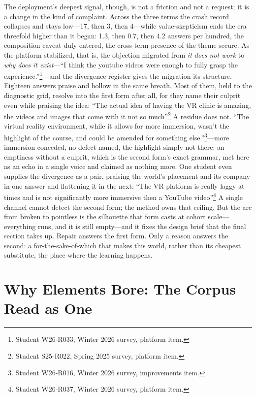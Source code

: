 \documentclass{article}
\begin{document}
The deployment's deepest signal, though, is not a friction and not a request; it is a change in the kind of complaint. Across the three terms the crash record collapses and stays low---17, then 3, then 4---while value-skepticism ends the era threefold higher than it began: 1.3, then 0.7, then 4.2 answers per hundred, the composition caveat duly entered, the cross-term presence of the theme secure. As the platform stabilized, that is, the objection migrated from \textit{it does not work} to \textit{why does it exist}---``I think the youtube videos were enough to fully grasp the experience.''\footnote{Student W26-R033, Winter 2026 survey, platform item.}---and the divergence register gives the migration its structure. Eighteen answers praise and hollow in the same breath. Most of them, held to the diagnostic grid, resolve into the first form after all, for they name their culprit even while praising the idea: ``The actual idea of having the VR clinic is amazing, the videos and images that come with it not so much''\footnote{Student S25-R022, Spring 2025 survey, platform item.} A residue does not. ``The virtual reality environment, while it allows for more immersion, wasn't the highlight of the course, and could be amended for something else.''\footnote{Student W26-R016, Winter 2026 survey, improvements item.}---more immersion conceded, no defect named, the highlight simply not there: an emptiness without a culprit, which is the second form's exact grammar, met here as an echo in a single voice and claimed as nothing more. One student even supplies the divergence as a pair, praising the world's placement and its company in one answer and flattening it in the next: ``The VR platform is really laggy at times and is not significantly more immersive then a YouTube video''\footnote{Student W26-R037, Winter 2026 survey, platform item.} A single channel cannot detect the second form; the method owns that ceiling. But the arc from broken to pointless is the silhouette that form casts at cohort scale---everything runs, and it is still empty---and it fixes the design brief that the final section takes up. Repair answers the first form. Only a reason answers the second: a for-the-sake-of-which that makes this world, rather than its cheapest substitute, the place where the learning happens.

\section{Why Elements Bore: The Corpus Read as One}
\end{document}
